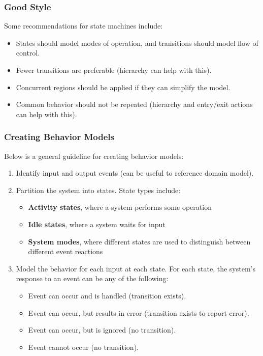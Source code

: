 \documentclass[12pt,titlepage]{article}
\begin{document}
      \subsubsection{Good Style}
        Some recommendations for state machines include:
        \begin{itemize}
          \item States should model modes of operation, and transitions should model flow of control.
          \item Fewer transitions are preferable (hierarchy can help with this).
          \item Concurrent regions should be applied if they can simplify the model.
          \item Common behavior should not be repeated (hierarchy and entry/exit actions can help with this).
        \end{itemize}

      \subsubsection{Creating Behavior Models}
        Below is a general guideline for creating behavior models:
        \begin{enumerate}
          \item Identify input and output events (can be useful to reference domain model).
          \item Partition the system into states. State types include:
            \begin{itemize}
              \item \textbf{Activity states}, where a system performs some operation
              \item \textbf{Idle states}, where a system waits for input
              \item \textbf{System modes}, where different states are used to distinguish between different event reactions
            \end{itemize}
          \item Model the behavior for each input at each state. For each state, the system's response to an event can be any of the following:
            \begin{itemize}
              \item Event can occur and is handled (transition exists).
              \item Event can occur, but results in error (transition exists to report error).
              \item Event can occur, but is ignored (no transition).
              \item Event cannot occur (no transition).
            \end{itemize}
        \end{enumerate}
\end{document}
